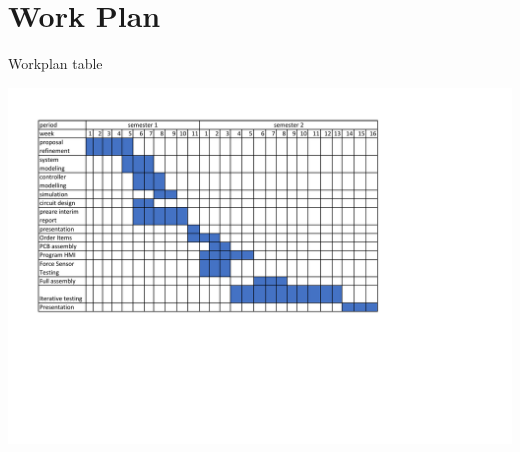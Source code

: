 \section{Work Plan}
\begin{center}
\begin{table}[!h]
\centering
\caption{Workplan table}
\includegraphics[width=0.95\linewidth]{Figures/workplan}
\end{table}
\end{center}

